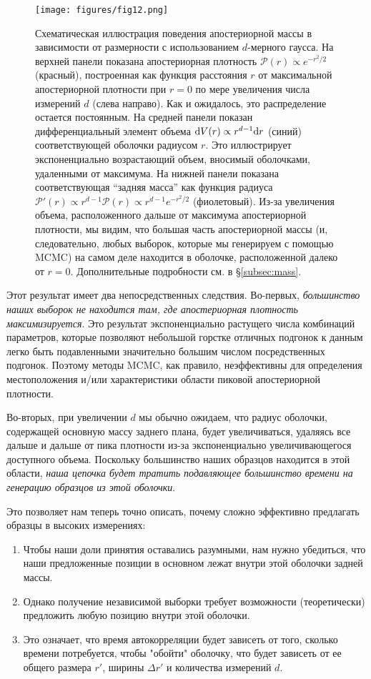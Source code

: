 \documentclass[12pt, titlepage]{article}
\newcommand{\deriv}{\ensuremath{{\rm d}}}  %
\newcommand{\posterior}{\ensuremath{\mathcal{P}}}
\begin{document}
\begin{figure}
\begin{center}
\texttt{[image: figures/fig12.png]}
\end{center}
\caption{Схематическая иллюстрация поведения апостериорной массы в зависимости от размерности с использованием $d$-мерного гаусса. На верхней панели показана апостериорная плотность $\posterior(r) \propto e^{-r^2/2}$ (красный), построенная как функция расстояния $r$ от максимальной апостериорной плотности при $r=0$ по мере увеличения числа измерений $d$ (слева направо). Как и ожидалось, это распределение остается постоянным. На средней панели показан дифференциальный элемент объема $\deriv V(r) \propto r^{d-1} \deriv r$ (синий) соответствующей оболочки радиусом $r$. Это иллюстрирует экспоненциально возрастающий объем, вносимый оболочками, удаленными от максимума. На нижней панели показана соответствующая ``задняя масса'' как функция радиуса $\posterior'(r) \propto r^{d-1} \posterior(r) \propto r^{d-1} e^{-r^2/2}$ (фиолетовый). Из-за увеличения объема, расположенного дальше от максимума апостериорной плотности, мы видим, что большая часть апостериорной массы (и, следовательно, любых выборок, которые мы генерируем с помощью MCMC) на самом деле находится в оболочке, расположенной далеко от $r=0$. Дополнительные подробности см. в \S\ref{subsec:mass}. }\label{fig:mass}
\end{figure}

 Этот результат имеет два непосредственных следствия. Во-первых, \textit{большинство наших выборок не находится там, где апостериорная плотность максимизируется}. Это результат экспоненциально растущего числа комбинаций параметров, которые позволяют небольшой горстке отличных подгонок к данным легко быть подавленными значительно большим числом посредственных подгонок. Поэтому методы MCMC, как правило, неэффективны для определения местоположения и/или характеристики области пиковой апостериорной плотности.

Во-вторых, при увеличении $d$ мы обычно ожидаем, что радиус оболочки, содержащей основную массу заднего плана, будет увеличиваться, удаляясь все дальше и дальше от пика плотности из-за экспоненциально увеличивающегося доступного объема. Поскольку большинство наших образцов находится в этой области, \textit{наша цепочка будет тратить подавляющее большинство времени на генерацию образцов из этой оболочки}.

Это позволяет нам теперь точно описать, почему сложно эффективно предлагать образцы в высоких измерениях: \begin{enumerate} \item Чтобы наши доли принятия оставались разумными, нам нужно убедиться, что наши предложенные позиции в основном лежат внутри этой оболочки задней массы. \item Однако получение независимой выборки требует возможности (теоретически) предложить любую позицию внутри этой оболочки. \item Это означает, что время автокорреляции будет зависеть от того, сколько времени потребуется, чтобы "обойти" оболочку, что будет зависеть от ее общего размера $r'$, ширины $\Delta r'$ и количества измерений $d$. \end{enumerate} 
\end{document}

